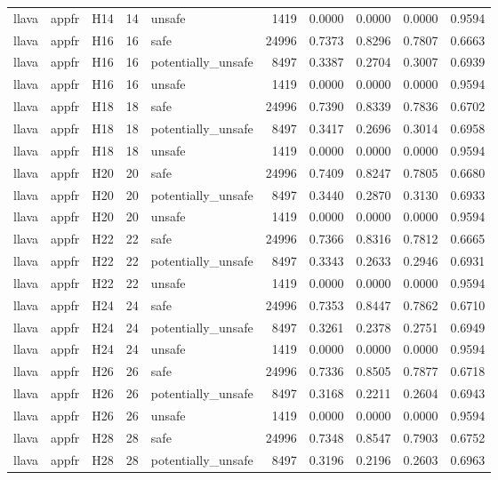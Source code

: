 \begin{table}[tbp]
\begin{tabular}{lllrlrrrrr}
llava & appfr & H14 & 14 & unsafe & 1419 & 0.0000 & 0.0000 & 0.0000 & 0.9594 \\
llava & appfr & H16 & 16 & safe & 24996 & 0.7373 & 0.8296 & 0.7807 & 0.6663 \\
llava & appfr & H16 & 16 & potentially\_unsafe & 8497 & 0.3387 & 0.2704 & 0.3007 & 0.6939 \\
llava & appfr & H16 & 16 & unsafe & 1419 & 0.0000 & 0.0000 & 0.0000 & 0.9594 \\
llava & appfr & H18 & 18 & safe & 24996 & 0.7390 & 0.8339 & 0.7836 & 0.6702 \\
llava & appfr & H18 & 18 & potentially\_unsafe & 8497 & 0.3417 & 0.2696 & 0.3014 & 0.6958 \\
llava & appfr & H18 & 18 & unsafe & 1419 & 0.0000 & 0.0000 & 0.0000 & 0.9594 \\
llava & appfr & H20 & 20 & safe & 24996 & 0.7409 & 0.8247 & 0.7805 & 0.6680 \\
llava & appfr & H20 & 20 & potentially\_unsafe & 8497 & 0.3440 & 0.2870 & 0.3130 & 0.6933 \\
llava & appfr & H20 & 20 & unsafe & 1419 & 0.0000 & 0.0000 & 0.0000 & 0.9594 \\
llava & appfr & H22 & 22 & safe & 24996 & 0.7366 & 0.8316 & 0.7812 & 0.6665 \\
llava & appfr & H22 & 22 & potentially\_unsafe & 8497 & 0.3343 & 0.2633 & 0.2946 & 0.6931 \\
llava & appfr & H22 & 22 & unsafe & 1419 & 0.0000 & 0.0000 & 0.0000 & 0.9594 \\
llava & appfr & H24 & 24 & safe & 24996 & 0.7353 & 0.8447 & 0.7862 & 0.6710 \\
llava & appfr & H24 & 24 & potentially\_unsafe & 8497 & 0.3261 & 0.2378 & 0.2751 & 0.6949 \\
llava & appfr & H24 & 24 & unsafe & 1419 & 0.0000 & 0.0000 & 0.0000 & 0.9594 \\
llava & appfr & H26 & 26 & safe & 24996 & 0.7336 & 0.8505 & 0.7877 & 0.6718 \\
llava & appfr & H26 & 26 & potentially\_unsafe & 8497 & 0.3168 & 0.2211 & 0.2604 & 0.6943 \\
llava & appfr & H26 & 26 & unsafe & 1419 & 0.0000 & 0.0000 & 0.0000 & 0.9594 \\
llava & appfr & H28 & 28 & safe & 24996 & 0.7348 & 0.8547 & 0.7903 & 0.6752 \\
llava & appfr & H28 & 28 & potentially\_unsafe & 8497 & 0.3196 & 0.2196 & 0.2603 & 0.6963 \\

\end{tabular}
\end{table}
